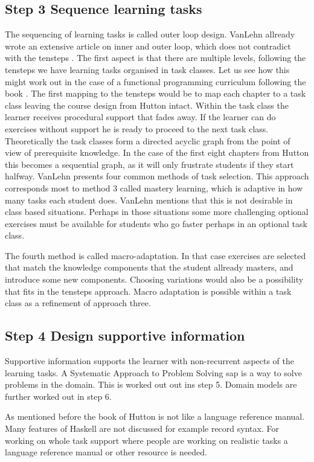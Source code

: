 \subsection {Step 3 Sequence learning tasks}
The sequencing of learning tasks is called outer loop design.
VanLehn allready wrote an extensive article  on inner and outer loop, which does not contradict with the \gls{tensteps} \citep{vanlehn2006}. 
The first aspect is that there are multiple levels, following the \gls{tensteps} we have learning tasks organised in task classes.
Let us see how this might work out in the case of a functional programming curriculum following the book \citep{hutton_2016}.
The first mapping to the \gls{tensteps} would be to map each chapter to a task class leaving the course design from Hutton intact. 
Within the task class the learner receives procedural support that fades away. 
If the learner can do exercises without support he is ready to proceed to the next task class.
Theoretically the task classes form a directed acyclic graph from the point of view of prerequisite knowledge.
In the case of the first eight chapters from Hutton this becomes a sequential graph, as it will only frustrate students if they start halfway.
VanLehn presents four common methods of task selection.
This approach corresponds most to method 3 called mastery learning, which is adaptive in how many tasks each student does.
VanLehn mentions that this is not desirable in class based situations. 
Perhaps in those situations some more challenging optional exercises must be available for students who go faster perhaps in an optional task class.

The fourth method is called macro-adaptation. 
In that case exercises are selected that match the knowledge components that the student allready masters, and introduce some new components. Choosing variations would  also be a possibility that fits in the \gls{tensteps} approach.
Macro adaptation is possible within a task class as a refinement of approach three.


\subsection{Step 4 Design supportive information}
Supportive information supports the learner with non-recurrent aspects of the learning tasks.
A Systematic Approach to Problem Solving \gls{sap} is a way to solve problems in the domain.
This is worked out out ins step 5.
Domain models are further worked out in step 6. 

As mentioned before the book of Hutton is not like a language reference manual.
Many features of Haskell are not discussed for example record syntax. 
For working on whole task support where people are working on realistic tasks a language reference manual or other resource is needed.


